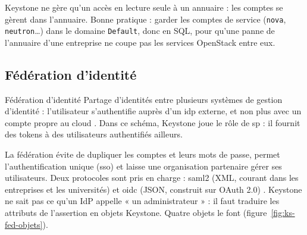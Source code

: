 \begin{remarque}
Keystone ne gère qu'un accès en lecture seule à un annuaire \parencite{keystone-config} : les comptes se gèrent dans l'annuaire.
Bonne pratique : garder les comptes de service (\texttt{nova}, \texttt{neutron}\dots) dans le domaine \texttt{Default}, donc en SQL,
pour qu'une panne de l'annuaire d'une entreprise ne coupe pas les services OpenStack entre eux.
\end{remarque}

\subsection{Fédération d'identité}\label{sec:ks-federation}

\begin{definition}{Fédération d'identité}
Partage d'identités entre plusieurs systèmes de gestion d'identité : l'utilisateur s'authentifie auprès d'un
\gls{idp} externe, et non plus avec un compte propre au cloud \parencite{keystone-federation}. Dans ce
schéma, Keystone joue le rôle de \gls{sp} : il fournit des tokens à des utilisateurs authentifiés ailleurs.
\end{definition}

La fédération évite de dupliquer les comptes et leurs mots de passe, permet l'authentification unique (\gls{sso}) et laisse une
organisation partenaire gérer ses utilisateurs. Deux protocoles sont pris en charge : \gls{saml2} (XML, courant dans les entreprises et
les universités) et \gls{oidc} (JSON, construit sur OAuth 2.0) \parencite{keystone-federation}. Keystone ne sait pas ce qu'un IdP appelle
« un administrateur » : il faut traduire les attributs de l'assertion en objets Keystone. Quatre objets le font
(figure~\ref{fig:ks-fed-objets}).

